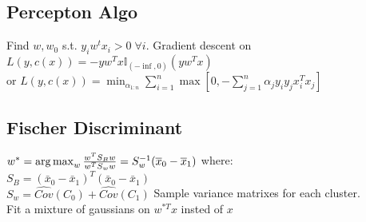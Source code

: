 \subsection*{Percepton Algo} 
Find \(w, w_0\) s.t. \(y_iw^tx_i > 0 \;\forall i\). Gradient descent on \(L(y,c(x))=-yw^Tx\mathbb{I}_{\left(-\inf, 0\right)}\left(yw^Tx\right)\)\\
or {\scriptsize $L(y,c(x)) = \min_{\alpha_{1:n}} \sum_{i=1}^n \max  [0,- \sum_{j=1}^n \alpha_j y_i y_j x_i^T x_j ]$}

\subsection*{Fischer Discriminant}
\(w^{*} = \operatorname*{arg\,max}_w \frac{w^TS_Bw}{w^TS_ww} = S_w^{-1}(\overline{x}_0-\overline{x}_1)\) where: \\
$S_B = (\bar{x}_0-\bar{x}_1)^T(\bar{x}_0-\bar{x}_1)$\\
\(S_w=\hat{Cov}(C_0) + \hat{Cov}(C_1)\) Sample variance matrixes for each cluster.\\
Fit a mixture of gaussians on $w^{*T}x$ insted of $x$

